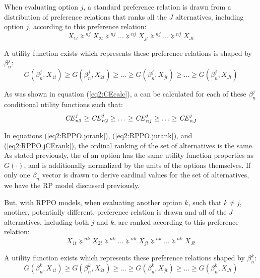 \documentclass[../main.tex]{subfiles}
\begin{document}
When evaluating option $j$, a standard preference relation is drawn from a distribution of preference relations that ranks all the $J$ alternatives, including option $j$, according to this preference relation:
\begin{equation}
	\label{eq2:RPPO.jorank}
	X_{1t} \succcurlyeq^{nj} X_{2t} \succcurlyeq^{nj} \ldots \succcurlyeq^{nj} X_{jt} \succcurlyeq^{nj} \ldots \succcurlyeq^{nj} X_{Jt}
\end{equation}

\noindent A utility function exists which represents these preference relations is shaped by $\beta_n^j$:
\begin{equation}
	\label{eq2:RPPO.jurank}
	G(\beta_n^j,X_{1t}) \geq G(\beta_n^j,X_{2t}) \geq \ldots \geq G(\beta_n^j,X_{jt}) \geq \ldots \geq G(\beta_n^j,X_{Jt})
\end{equation}

As was shown in equation (\ref{eq2:CEcalc}), a {\CE} can be calculated for each of these $\beta_n^j$ conditional utility functions such that:
\begin{equation}
	\label{eq2:RPPO.jCErank}
	{\ensuremath{\mathit{CE}}}^j_{n1} \geq {\ensuremath{\mathit{CE}}}^j_{n2} \geq \ldots \geq {\ensuremath{\mathit{CE}}}^j_{nj} \geq \ldots \geq {\ensuremath{\mathit{CE}}}^j_{nJ}
\end{equation}

In equations (\ref{eq2:RPPO.jorank}), (\ref{eq2:RPPO.jurank}), and (\ref{eq2:RPPO.jCErank}), the ordinal ranking of the set of alternatives is the same.
As stated previously, the {\CE} of an option has the same utility function properties as $G(\cdot)$, and is additionally normalized by the units of the options themselves.
If only one $\beta_n$ vector is drawn to derive cardinal values for the set of alternatives, we have the RP model discussed previously.

But, with RPPO models, when evaluating another option $k$, such that $k \neq j$, another, potentially different, preference relation is drawn and all of the $J$ alternatives, including both $j$ and $k$, are ranked according to this preference relation:
\begin{equation}
	\label{eq2:RPPO.korank}
	X_{1t} \succcurlyeq^{nk} X_{2t} \succcurlyeq^{nk} \ldots \succcurlyeq^{nk} X_{jt} \succcurlyeq^{nk} \ldots \succcurlyeq^{nk} X_{Jt}
\end{equation}

\noindent A utility function exists which represents these preference relations shaped by $\beta_n^k$:
\begin{equation}
	\label{eq2:RPPO.kurank}
	G(\beta_n^k,X_{1t}) \geq G(\beta_n^k,X_{2t}) \geq \ldots \geq G(\beta_n^k,X_{jt}) \geq \ldots \geq G(\beta_n^k,X_{Jt})
\end{equation}
\end{document}
